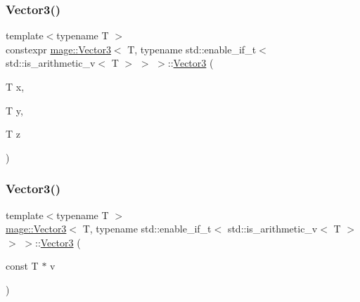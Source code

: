 \subsubsection{\texorpdfstring{Vector3()}{Vector3()}\hspace{0.1cm}{\footnotesize\ttfamily [2/7]}}
{\footnotesize\ttfamily template$<$typename T $>$ \\
constexpr \hyperlink{structmage_1_1_vector3}{mage\+::\+Vector3}$<$ T, typename std\+::enable\+\_\+if\+\_\+t$<$ std\+::is\+\_\+arithmetic\+\_\+v$<$ T $>$ $>$ $>$\+::\hyperlink{structmage_1_1_vector3}{Vector3} (\begin{DoxyParamCaption}\item[{T}]{x,  }\item[{T}]{y,  }\item[{T}]{z }\end{DoxyParamCaption})\hspace{0.3cm}{\ttfamily [noexcept]}}

\hypertarget{structmage_1_1_vector3_3_01_t_00_01typename_01std_1_1enable__if__t_3_01std_1_1is__arithmetic__v_3_01_t_01_4_01_4_01_4_affe855e2a613491a3c02b2e9cdc7b831}{}\label{structmage_1_1_vector3_3_01_t_00_01typename_01std_1_1enable__if__t_3_01std_1_1is__arithmetic__v_3_01_t_01_4_01_4_01_4_affe855e2a613491a3c02b2e9cdc7b831} 
\subsubsection{\texorpdfstring{Vector3()}{Vector3()}\hspace{0.1cm}{\footnotesize\ttfamily [3/7]}}
{\footnotesize\ttfamily template$<$typename T $>$ \\
\hyperlink{structmage_1_1_vector3}{mage\+::\+Vector3}$<$ T, typename std\+::enable\+\_\+if\+\_\+t$<$ std\+::is\+\_\+arithmetic\+\_\+v$<$ T $>$ $>$ $>$\+::\hyperlink{structmage_1_1_vector3}{Vector3} (\begin{DoxyParamCaption}\item[{const T $\ast$}]{v }\end{DoxyParamCaption})\hspace{0.3cm}{\ttfamily [noexcept]}}

